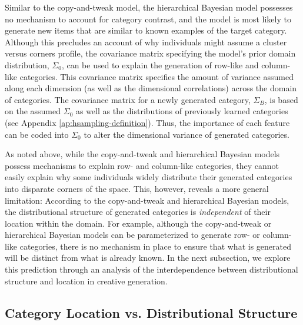 \documentclass[12pt]{article}
\begin{document}
\begin{flushleft}
Similar to the copy-and-tweak model, the hierarchical Bayesian model possesses no mechanism to account for category contrast, and the model is most likely to generate new items that are similar to known examples of the target category. Although this precludes an account of why individuals might assume a cluster versus corners profile, the covariance matrix specifying the model's prior domain distribution, $\Sigma_0$, can be used to explain the generation of row-like and column-like categories. This covariance matrix specifies the amount of variance assumed along each dimension (as well as the dimensional correlations) across the domain of categories. The covariance matrix for a newly generated category, $\Sigma_B$, is based on the assumed $\Sigma_0$ as well as the distributions of previously learned categories (see Appendix \ref{ap:hsampling-definition}). Thus, the importance of each feature can be coded into $\Sigma_0$ to alter the dimensional variance of generated categories.

As noted above, while the copy-and-tweak and hierarchical Bayesian models possess mechanisms to explain row- and column-like categories, they cannot easily explain why some individuals widely distribute their generated categories into disparate corners of the space. This, however, reveals a more general limitation: According to the copy-and-tweak and hierarchical Bayesian models, the distributional structure of generated categories is {\em independent} of their location within the domain. For example, although the copy-and-tweak or hierarchical Bayesian models can be parameterized to generate row- or column-like categories, there is no mechanism in place to ensure that what is generated will be distinct from what is already known. In the next subsection, we explore this prediction through an analysis of the interdependence between distributional structure and location in creative generation.

\subsection{Category Location vs. Distributional Structure}


\end{flushleft}
\end{document}
